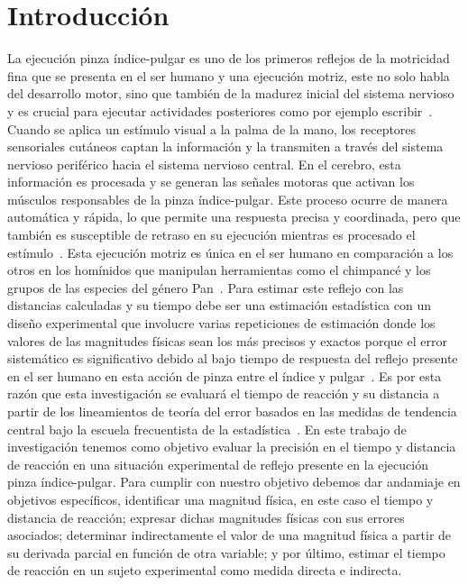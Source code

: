 \documentclass[runningheads]{llncs}
\begin{document}
    \section*{\centering Introducción}
        La ejecución pinza índice-pulgar es uno de los primeros reflejos de la motricidad fina que se presenta en el ser humano y una ejecución motriz, este no solo habla del desarrollo motor, sino que también de la madurez inicial del sistema nervioso y es crucial para ejecutar actividades posteriores como por ejemplo escribir~\cite{gomez2015desarrollo}. 
        Cuando se aplica un estímulo visual a la palma de la mano, los receptores sensoriales cutáneos captan la información y la transmiten a través del sistema nervioso periférico hacia el sistema nervioso central. 
        En el cerebro, esta información es procesada y se generan las señales motoras que activan los músculos responsables de la pinza índice-pulgar. Este proceso ocurre de manera automática y rápida, lo que permite una respuesta precisa y coordinada, pero que también es susceptible de retraso en su ejecución mientras es procesado el estímulo~\cite{guyton1977tratado}. 
        Esta ejecución motriz es única en el ser humano en comparación a los otros en los homínidos que manipulan herramientas como el chimpancé y los grupos de las especies del género Pan~\cite{perezpreferencia}. Para estimar este reflejo con las distancias calculadas y su tiempo debe ser una estimación estadística con un diseño experimental 
        que involucre varias repeticiones de estimación donde los valores de las magnitudes físicas sean los más precisos y exactos porque el error sistemático es significativo debido al bajo tiempo de respuesta del reflejo presente en el ser humano en esta acción de pinza entre el índice y pulgar~\cite{sandoval2021estudio}.
        Es por esta razón que esta investigación se evaluará el tiempo de reacción y su distancia a partir de los lineamientos de teoría del error basados en las medidas de tendencia central bajo la escuela frecuentista de la estadística~\cite{quezada2007potencia}. 
        \linebreak
        En este trabajo de investigación tenemos como objetivo evaluar la precisión en el tiempo y distancia de reacción en una situación experimental de reflejo presente en la ejecución pinza índice-pulgar. Para cumplir con nuestro objetivo debemos dar andamiaje en objetivos específicos, 
        identificar una magnitud física, en este caso el tiempo y distancia de reacción; expresar dichas magnitudes físicas con sus errores asociados; determinar indirectamente el valor de una magnitud física a partir de su derivada parcial en función de otra variable; y por último, 
        estimar el tiempo de reacción en un sujeto experimental como medida directa e indirecta.
\end{document}

